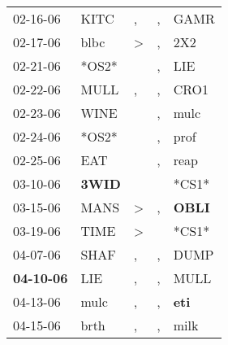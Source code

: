 \begin{supertabular}{p{0.07\textwidth}p{0.06\textwidth}p{0.02\textwidth}p{0.02\textwidth}p{0.06\textwidth}}
          02-16-06\textsuperscript{} &           KITC\textsuperscript{} &                , &             , &           GAMR\textsuperscript{} \\
          02-17-06\textsuperscript{} &           blbc\textsuperscript{} &     \textgreater &             , &            2X2\textsuperscript{} \\
          02-21-06\textsuperscript{} &                            *OS2* &                  &             , &            LIE\textsuperscript{} \\
          02-22-06\textsuperscript{} &           MULL\textsuperscript{} &                , &             , &           CRO1\textsuperscript{} \\
          02-23-06\textsuperscript{} &           WINE\textsuperscript{} &                  &             , &           mulc\textsuperscript{} \\
          02-24-06\textsuperscript{} &                            *OS2* &                  &             , &           prof\textsuperscript{} \\
          02-25-06\textsuperscript{} &            EAT\textsuperscript{} &                  &             , &           reap\textsuperscript{} \\
          03-10-06\textsuperscript{} &  \textbf{3WID\textsuperscript{}} &                  &               &                            *CS1* \\
          03-15-06\textsuperscript{} &           MANS\textsuperscript{} &     \textgreater &             , &  \textbf{OBLI\textsuperscript{}} \\
          03-19-06\textsuperscript{} &           TIME\textsuperscript{} &     \textgreater &               &                            *CS1* \\
          04-07-06\textsuperscript{} &           SHAF\textsuperscript{} &                , &             , &           DUMP\textsuperscript{} \\
 \textbf{04-10-06\textsuperscript{}} &            LIE\textsuperscript{} &                , &             , &           MULL\textsuperscript{} \\
          04-13-06\textsuperscript{} &           mulc\textsuperscript{} &                , &             , &   \textbf{eti\textsuperscript{}} \\
          04-15-06\textsuperscript{} &           brth\textsuperscript{} &                , &             , &           milk\textsuperscript{} \\

\end{supertabular}
